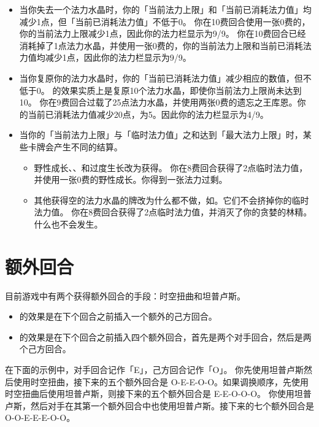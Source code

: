 \begin{itemize}
    \item 当你失去一个法力水晶时，你的「当前法力上限」和「当前已消耗法力值」均减少1点，但「当前已消耗法力值」不低于0。
        \example 你在10费回合使用一张0费的，你的当前法力上限减少1点，因此你的法力栏显示为9/9。
        \example 你在10费回合已经消耗掉了1点法力水晶，并使用一张0费的，你的当前法力上限和当前已消耗法力值均减少1点，因此你的法力栏显示为9/9。
    \item 当你复原你的法力水晶时，你的「当前已消耗法力值」减少相应的数值，但不低于0。
        \notice {}的效果实质上是复原10个法力水晶，即使你当前法力上限尚未达到10。
        \example 你在9费回合过载了25点法力水晶，并使用两张0费的遗忘之王库恩。你的当前已消耗法力值减少20点，为5。因此你的法力栏显示为4/9。
    \item 当你的「当前法力上限」与「临时法力值」之和达到「最大法力上限」时，某些卡牌会产生不同的结算。
    \begin{itemize}
        \item  野性成长、、和过度生长改为获得。
            \example 你在8费回合获得了2点临时法力值，并使用一张0费的野性成长。你得到一张法力过剩。
        \item 其他获得空的法力水晶的牌改为什么都不做，如。它们不会挤掉你的临时法力值。
            \example 你在8费回合获得了2点临时法力值，并消灭了你的贪婪的林精。什么也不会发生。
    \end{itemize}
\end{itemize}

\section{额外回合}
目前游戏中有两个获得额外回合的手段：时空扭曲和坦普卢斯。
\begin{itemize}
    \item {}的效果是在下个回合之前插入一个额外的己方回合。
    \item {}的效果是在下个回合之前插入四个额外回合，首先是两个对手回合，然后是两个己方回合。
\end{itemize}

\notice 在下面的示例中，对手回合记作「E」，己方回合记作「O」。
\example 你先使用坦普卢斯然后使用时空扭曲，接下来的五个额外回合是 O-E-E-O-O。如果调换顺序，先使用时空扭曲后使用坦普卢斯，则接下来的五个额外回合是 E-E-O-O-O。
\example 你使用坦普卢斯，然后对手在其第一个额外回合中也使用坦普卢斯。接下来的七个额外回合是 O-O-E-E-E-O-O。

